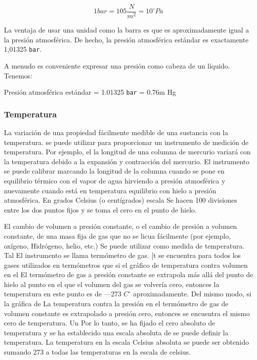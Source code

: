 \begin{equation}
    1 bar = 105\frac{N}{m^2} = 10^{\circ} Pa
\end{equation}

La ventaja de usar una unidad como la barra es que es aproximadamente igual
a la presión atmosférica. De hecho, la presión atmosférica estándar es exactamente
1,01325 \texttt{bar}.

A menudo es conveniente expresar una presión como cabeza de un líquido. Tenemos:

Presión atmosférica estándar = 1.01325 \texttt{bar} = 0.76m Hg

\subsubsection{Temperatura}

La variación de una propiedad fácilmente medible de una sustancia con la temperatura.
se puede utilizar para proporcionar un instrumento de medición de temperatura. Por ejemplo, el
la longitud de una columna de mercurio variará con la temperatura debido a la expansión
y contracción del mercurio. El instrumento se puede calibrar marcando
la longitud de la columna cuando se pone en equilibrio térmico con el
vapor de agua hirviendo a presión atmosférica y nuevamente cuando está en temperatura
equilibrio con hielo a presión atmosférica. En grados Celsius (o centígrados)
escala Se hacen 100 divisiones entre los dos puntos fijos y se toma el cero
en el punto de hielo.

El cambio de volumen a presión constante, o el cambio de presión a
volumen constante, de una masa fija de gas que no se licua fácilmente (por ejemplo, oxígeno,
Hidrógeno, helio, etc.) Se puede utilizar como medida de temperatura. Tal
El instrumento se llama termómetro de gas. [t se encuentra para todos los gases utilizados en
termómetros que si el gráfico de temperatura contra volumen en el
El termómetro de gas a presión constante se extrapola más allá del punto de hielo al
punto en el que el volumen del gas se volvería cero, entonces la temperatura
en este punto es de —273 $C^{\circ}$ aproximadamente. Del mismo modo, si la gráfica de
La temperatura contra la presión en el termómetro de gas de volumen constante es
extrapolado a presión cero, entonces se encuentra el mismo cero de temperatura. Un
Por lo tanto, se ha fijado el cero absoluto de temperatura y se ha establecido una escala absoluta de
se puede definir la temperatura. La temperatura en la escala Celsius absoluta se puede
ser obtenido sumando 273 a todas las temperaturas en la escala de celsius.

